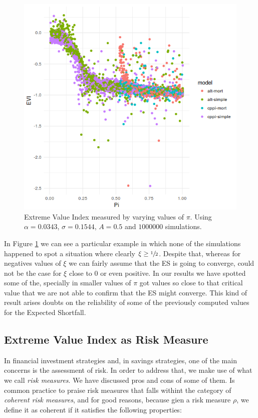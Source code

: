 \begin{figure}[h]
    \centering
    \includegraphics[scale=0.75]{images/evi-pi_.png}
    \caption{Extreme Value Index measured by varying values of $\pi$.  Using $\alpha = 0.0343$, $\sigma = 0.1544$, $A = 0.5$ and $1000000$ simulations.}
    \label{fig:evi-pi}
\end{figure}

In Figure \ref{fig:evi-pi} we can see a particular example in which none of the simulations happened to spot a situation where clearly $\xi \geq \sfrac{1}{2}$. Despite that, whereas for negatives values of $\xi$ we can fairly assume that the ES is going to converge, could not be the case for $\xi$ close to $0$ or even positive. In our results we have spotted some of the, specially in smaller values of $\pi$ got values so close to that critical value that we are not able to confirm that the ES might converge. This kind of result arises doubts on the reliability of some of the previously computed values for the Expected Shortfall.


\subsection{Extreme Value Index as Risk Measure}

In financial investment strategies and, in savings strategies, one of the main concerns is the assessment of risk. In order to address that, we make use of what we call \emph{risk measures}. We have discussed pros and cons of some of them. Is common practice to praise risk measures that falls withint the category of \emph{coherent risk measures}, and for good reasons, because gien a risk measure $\rho$, we define it as coherent if it satisfies the following properties:

